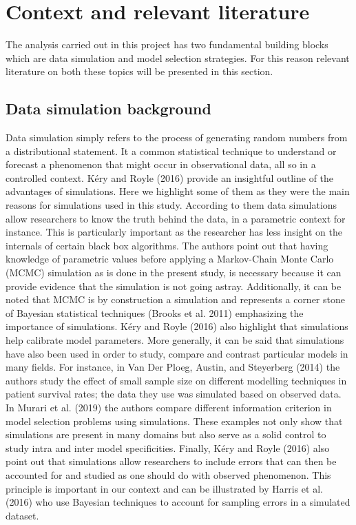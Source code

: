 \documentclass[12pt,]{article}
\begin{document}
\hypertarget{literature}{%
\section{Context and relevant literature}\label{literature}}

The analysis carried out in this project has two fundamental building blocks which are data simulation and model selection strategies. For this reason relevant literature on both these topics will be presented in this section.

\hypertarget{data-simulation-background}{%
\subsection{Data simulation background}\label{data-simulation-background}}

Data simulation simply refers to the process of generating random numbers from a distributional statement. It a common statistical technique to understand or forecast a phenomenon that might occur in observational data, all so in a controlled context. Kéry and Royle (2016) provide an insightful outline of the advantages of simulations. Here we highlight some of them as they were the main reasons for simulations used in this study. According to them data simulations allow researchers to know the truth behind the data, in a parametric context for instance. This is particularly important as the researcher has less insight on the internals of certain black box algorithms. The authors point out that having knowledge of parametric values before applying a Markov-Chain Monte Carlo (MCMC) simulation as is done in the present study, is necessary because it can provide evidence that the simulation is not going astray. Additionally, it can be noted that MCMC is by construction a simulation and represents a corner stone of Bayesian statistical techniques (Brooks et al. 2011) emphasizing the importance of simulations. Kéry and Royle (2016) also highlight that simulations help calibrate model parameters. More generally, it can be said that simulations have also been used in order to study, compare and contrast particular models in many fields. For instance, in Van Der Ploeg, Austin, and Steyerberg (2014) the authors study the effect of small sample size on different modelling techniques in patient survival rates; the data they use was simulated based on observed data. In Murari et al. (2019) the authors compare different information criterion in model selection problems using simulations. These examples not only show that simulations are present in many domains but also serve as a solid control to study intra and inter model specificities. Finally, Kéry and Royle (2016) also point out that simulations allow researchers to include errors that can then be accounted for and studied as one should do with observed phenomenon. This principle is important in our context and can be illustrated by Harris et al. (2016) who use Bayesian techniques to account for sampling errors in a simulated dataset.
\end{document}
